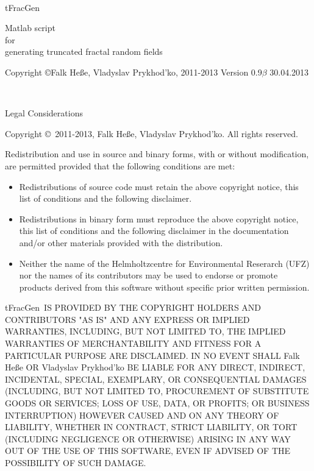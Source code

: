 \documentclass[12pt]{report}
\def\QI{{\sc tFracGen}}
\begin{document}
\ \vskip4cm
{\centering\huge \QI\ \par}
\vskip1cm
{\LARGE\sc\centering Matlab script\\ for\\ generating truncated fractal random fields\par}

\vskip15mm
\begin{center}
  \par
\end{center}

\vfill
{\sf Copyright \copyright Falk He{\ss}e, Vladyslav Prykhod'ko, 2011-2013
\hfill Version 0.9$\beta$ 30.04.2013}

\break

\begingroup\leftskip=5mm\parindent=0mm\sf\ \vfill

{\large\sc Legal Considerations\par}
\smallskip

Copyright \copyright\ 2011-2013, Falk He{\ss}e, Vladyslav Prykhod'ko.
All rights reserved.

Redistribution and use in source and binary forms, with or without
modification, are permitted provided that the following conditions are met:

\begin{itemize}
	\item Redistributions of source code must retain the above copyright notice, this list of conditions and the following disclaimer.
	\item Redistributions in binary form must reproduce the above copyright notice, this list of conditions and the following disclaimer in the documentation and/or other materials provided with the distribution.
	\item Neither the name of the Helmholtzcentre for Environmental Reserarch (UFZ) nor the names of its contributors may be used to endorse or promote products derived from this software without specific prior written permission.
\end{itemize}

\QI\ IS PROVIDED BY THE COPYRIGHT HOLDERS AND CONTRIBUTORS "AS IS" AND ANY EXPRESS OR IMPLIED WARRANTIES, INCLUDING, BUT NOT LIMITED TO, THE IMPLIED WARRANTIES OF MERCHANTABILITY AND FITNESS FOR A PARTICULAR PURPOSE ARE DISCLAIMED. IN NO EVENT SHALL Falk He{\ss}e OR Vladyslav Prykhod'ko BE LIABLE FOR ANY DIRECT, INDIRECT, INCIDENTAL, SPECIAL, EXEMPLARY, OR CONSEQUENTIAL DAMAGES (INCLUDING, BUT NOT LIMITED TO, PROCUREMENT OF SUBSTITUTE GOODS OR SERVICES; LOSS OF USE, DATA, OR PROFITS; OR BUSINESS INTERRUPTION) HOWEVER CAUSED AND ON ANY THEORY OF LIABILITY, WHETHER IN CONTRACT, STRICT LIABILITY, OR TORT (INCLUDING NEGLIGENCE OR OTHERWISE) ARISING IN ANY WAY OUT OF THE USE OF THIS SOFTWARE, EVEN IF ADVISED OF THE POSSIBILITY OF SUCH DAMAGE.
\end{document}
